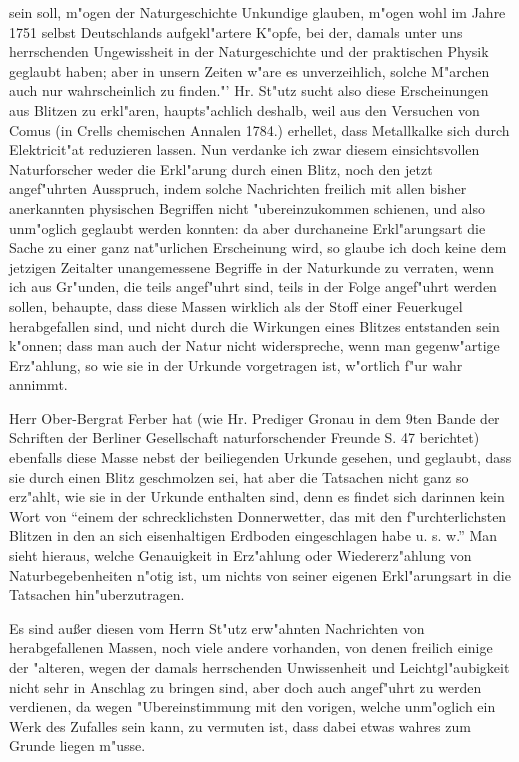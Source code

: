 \documentclass[a4paper, 11pt, oneside, polutonikogreek, german]{article}
\begin{document}
sein soll, m"ogen der Naturgeschichte Unkundige glauben, m"ogen wohl im Jahre 1751 selbst Deutschlands aufgekl"artere K"opfe, bei der, damals unter uns herrschenden Ungewissheit in der Naturgeschichte und der praktischen Physik geglaubt haben; aber in unsern Zeiten w"are es unverzeihlich, solche M"archen auch nur wahrscheinlich zu finden."' Hr. St"utz sucht also diese Erscheinungen aus Blitzen zu erkl"aren, haupts"achlich deshalb, weil aus den Versuchen von Comus (in Crells chemischen Annalen 1784.) erhellet, dass Metallkalke sich durch Elektricit"at reduzieren lassen. Nun verdanke ich zwar diesem einsichtsvollen Naturforscher weder die Erkl"arung durch einen Blitz, noch den jetzt angef"uhrten Ausspruch, indem solche Nachrichten freilich mit allen bisher anerkannten physischen Begriffen nicht "ubereinzukommen schienen, und also unm"oglich geglaubt werden konnten: da aber durchaneine Erkl"arungsart die Sache zu einer ganz nat"urlichen Erscheinung wird, so glaube ich doch keine dem jetzigen Zeitalter unangemessene Begriffe in der Naturkunde zu verraten, wenn ich aus Gr"unden, die teils angef"uhrt sind, teils in der Folge angef"uhrt werden sollen, behaupte, dass diese Massen wirklich als der Stoff einer Feuerkugel herabgefallen sind, und nicht durch die Wirkungen eines Blitzes entstanden sein k"onnen; dass man auch der Natur nicht widerspreche, wenn man gegenw"artige Erz"ahlung, so wie sie in der Urkunde vorgetragen ist, w"ortlich f"ur wahr annimmt.

Herr Ober-Bergrat Ferber hat (wie Hr. Prediger Gronau in dem 9ten Bande der Schriften der Berliner Gesellschaft naturforschender Freunde S. 47 berichtet) ebenfalls diese Masse nebst der beiliegenden Urkunde gesehen, und geglaubt, dass sie durch einen Blitz geschmolzen sei, hat aber die Tatsachen nicht ganz so erz"ahlt, wie sie in der Urkunde enthalten sind, denn es findet sich darinnen kein Wort von "`einem der schrecklichsten Donnerwetter, das mit den f"urchterlichsten Blitzen in den an sich eisenhaltigen Erdboden eingeschlagen habe u. s. w."' Man sieht hieraus, welche Genauigkeit in Erz"ahlung oder Wiedererz"ahlung von Naturbegebenheiten n"otig ist, um nichts von seiner eigenen Erkl"arungsart in die Tatsachen hin"uberzutragen.

Es sind außer diesen vom Herrn St"utz erw"ahnten Nachrichten von herabgefallenen Massen, noch viele andere vorhanden, von denen freilich einige der "alteren, wegen der damals herrschenden Unwissenheit und Leichtgl"aubigkeit nicht sehr in Anschlag zu bringen sind, aber doch auch angef"uhrt zu werden verdienen, da wegen "Ubereinstimmung mit den vorigen, welche unm"oglich ein Werk des Zufalles sein kann, zu vermuten ist, dass dabei etwas wahres zum Grunde liegen m"usse.
\end{document}
